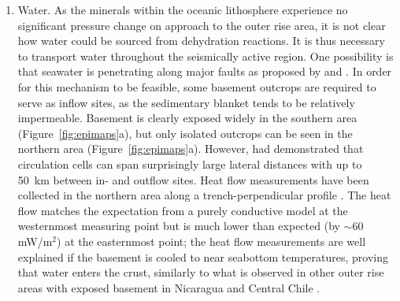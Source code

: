 \documentclass[reviewcopy]{elsarticle}
\begin{document}
\begin{enumerate}
\item Water. As the minerals within the oceanic lithosphere experience
  no significant pressure change on approach to the outer rise area,
  it is not clear how water could be sourced from dehydration
  reactions.  It is thus necessary to transport water throughout the
  seismically active region.   One possibility is that seawater is
  penetrating along major faults as proposed by \citet{ranero03} and
  \citet{peacock01}.   In order for this mechanism to be feasible,
  some basement outcrops are required to serve as inflow sites,
 as the sedimentary blanket tends to be relatively
 impermeable.
Basement is clearly exposed widely in the southern area
(Figure~\ref{fig:epimaps}a), but only isolated outcrops can be seen in
the northern area (Figure~\ref{fig:epimaps}a).  However,
\citet{fisher03} had demonstrated that circulation cells can span
surprisingly large lateral distances with up to 50~km between in- and
outflow sites.  Heat flow measurements have been collected in the
northern area along a trench-perpendicular profile \citep{heesemann07abs}. The
heat flow matches the expectation from a purely conductive model at
the westernmost measuring point but is much lower than expected (by
$\sim$60 mW/m$^2$) at the easternmost point; the heat flow
measurements are well explained if the basement is cooled to near
seabottom temperatures, proving that water enters the crust, similarly
to what is observed in other outer rise areas with exposed
basement in Nicaragua and Central Chile \citep{grevemeyer05}.


\end{enumerate}
\end{document}

